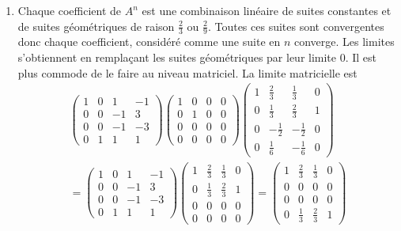 \begin{enumerate}
\begin{enumerate}
  \item Chaque coefficient de $A^n$ est une combinaison linéaire de suites constantes et de suites  géométriques de raison $\frac{2}{3}$ ou $\frac{2}{9}$. Toutes ces suites sont convergentes donc chaque coefficient, considéré comme une suite en $n$ converge. Les limites s'obtiennent en remplaçant les suites géométriques par leur limite $0$. Il est plus commode de le faire au niveau matriciel. La limite matricielle est
\begin{multline*}
\begin{pmatrix}
  1 & 0 & 1  & -1 \\
  0 & 0 & -1 & 3  \\
  0 & 0 & -1 & -3 \\
  0 & 1 &  1 & 1
\end{pmatrix}
\begin{pmatrix}
  1 & 0 & 0 & 0 \\
  0 & 1 & 0 & 0 \\
  0 & 0 & 0 & 0 \\
  0 & 0 & 0 & 0
\end{pmatrix}
\begin{pmatrix}
1 & \frac{2}{3} & \frac{1}{3}  & 0 \\
0 & \frac{1}{3} & \frac{2}{3} & 1  \\
0 & -\frac{1}{2} & -\frac{1}{2} & 0 \\
0 & \frac{1}{6} & -\frac{1}{6}  & 0
\end{pmatrix} \\
=  
\begin{pmatrix}
  1 & 0 & 1  & -1 \\
  0 & 0 & -1 & 3  \\
  0 & 0 & -1 & -3 \\
  0 & 1 &  1 & 1
\end{pmatrix}
\begin{pmatrix}
1 & \frac{2}{3} & \frac{1}{3} & 0 \\
0 & \frac{1}{3} & \frac{2}{3} & 1  \\
0 & 0           & 0           & 0 \\
0 & 0           & 0           & 0
\end{pmatrix} 
=
\begin{pmatrix}
1 & \frac{2}{3}  & \frac{1}{3} & 0 \\
0 & 0  & 0 & 0  \\
0 & 0 & 0 & 0 \\
0 & \frac{1}{3} & \frac{2}{3} & 1  
\end{pmatrix} 
\end{multline*}
\end{enumerate}

\end{enumerate}


